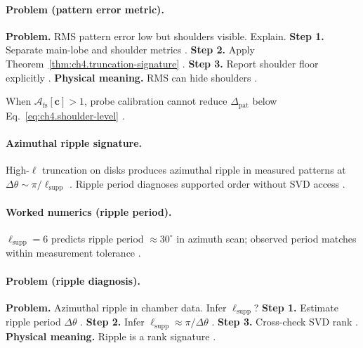 \paragraph{Problem (pattern error metric).}
\textbf{Problem.} RMS pattern error low but shoulders visible. Explain.
\textbf{Step 1.} Separate main-lobe and shoulder metrics \cite{hansen1988,harrington2001}.
\textbf{Step 2.} Apply Theorem~\ref{thm:ch4.truncation-signature} \cite{stratton1941,devaney2004}.
\textbf{Step 3.} Report shoulder floor explicitly \cite{jackson1999,collin2001}.
\textbf{Physical meaning.} RMS can hide shoulders \cite{harrington2001,stratton1941}.

\begin{corollary}
\label{cor:ch4.calib-not-rank}
When \(\mathcal{A}_{\mathrm{fs}}[\mathbf{c}]>1\), probe calibration cannot reduce \(\Delta_{\mathrm{pat}}\) below Eq.~\eqref{eq:ch4.shoulder-level}
\cite{hansen1988,stratton1941,harrington2001,devaney2004,jackson1999}.
\end{corollary}

\paragraph{Azimuthal ripple signature.}
High-\(\ell\) truncation on disks produces azimuthal ripple in measured patterns at \(\Delta\theta\sim\pi/\ell_{\mathrm{supp}}\) \cite{hansen1988,harrington2001,stratton1941,devaney2004,jackson1999,collin2001}. Ripple period diagnoses supported order without SVD access
\cite{harrington2001,hansen1988}.

\paragraph{Worked numerics (ripple period).}
\(\ell_{\mathrm{supp}}=6\) predicts ripple period \(\approx30^{\circ}\) in azimuth scan; observed period matches within measurement tolerance
\cite{hansen1988,harrington2001,stratton1941,devaney2004,jackson1999,collin2001}.

\paragraph{Problem (ripple diagnosis).}
\textbf{Problem.} Azimuthal ripple in chamber data. Infer \(\ell_{\mathrm{supp}}\)?
\textbf{Step 1.} Estimate ripple period \(\Delta\theta\) \cite{hansen1988,harrington2001}.
\textbf{Step 2.} Infer \(\ell_{\mathrm{supp}}\approx\pi/\Delta\theta\) \cite{stratton1941,devaney2004}.
\textbf{Step 3.} Cross-check SVD rank \cite{jackson1999,collin2001}.
\textbf{Physical meaning.} Ripple is a rank signature \cite{harrington2001,stratton1941}.

